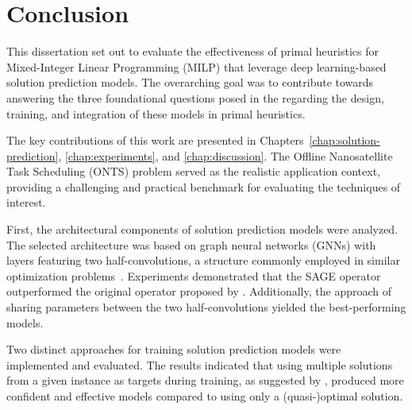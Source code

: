 % 

\chapter*{Conclusion}\label{conclusion}


This dissertation set out to evaluate the effectiveness of primal heuristics for Mixed-Integer Linear Programming (MILP) that leverage deep learning-based solution prediction models.
The overarching goal was to contribute towards answering the three foundational questions posed in the  regarding the design, training, and integration of these models in primal heuristics.

The key contributions of this work are presented in Chapters~\ref{chap:solution-prediction}, \ref{chap:experiments}, and \ref{chap:discussion}.
The Offline Nanosatellite Task Scheduling (ONTS) problem served as the realistic application context, providing a challenging and practical benchmark for evaluating the techniques of interest.

First, the architectural components of solution prediction models were analyzed.
The selected architecture was based on graph neural networks (GNNs) with layers featuring two half-convolutions, a structure commonly employed in similar optimization problems~\cite{gasseExactCombinatorialOptimization2019,nairSolvingMixedInteger2021,khalilMIPGNNDataDrivenFramework2022,cappartCombinatorialOptimizationReasoning2022}.
Experiments demonstrated that the SAGE operator outperformed the original operator proposed by .
Additionally, the approach of sharing parameters between the two half-convolutions yielded the best-performing models.

Two distinct approaches for training solution prediction models were implemented and evaluated.
The results indicated that using multiple solutions from a given instance as targets during training, as suggested by , produced more confident and effective models compared to using only a (quasi-)optimal solution.

